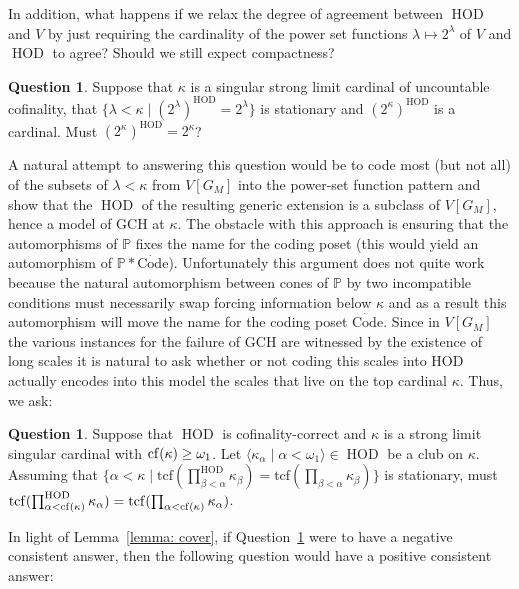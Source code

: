 \documentclass[11pt]{amsart}
\theoremstyle{definition}
\newtheorem{question}[theorem]{Question}
\theoremstyle{remark}
\DeclareMathOperator{\HOD}{HOD}
\newcommand{\cf}{{\rm cf}}
\begin{document}
In addition, what happens if we relax the degree of agreement between $\HOD$ and $V$ by just requiring the cardinality of the power set functions $\lambda \mapsto 2^\lambda$ of $V$ and $\HOD$ to agree? Should we still expect compactness?
\begin{question}\label{que: agreement 2kappa}
    Suppose that $\kappa$ is a  singular strong limit cardinal  of uncountable cofinality, that $\{\lambda < \kappa\mid (2^\lambda)^{\HOD}=2^\lambda\}$ is stationary and $(2^\kappa)^{\HOD}$ is a cardinal. Must $(2^\kappa)^{\HOD}=2^\kappa$?
\end{question}
A natural attempt to answering this question would be to code most (but not all) of the subsets of $\lambda < \kappa$ from $V[G_M]$ into the power-set function pattern and show that the $\HOD$ of the resulting generic extension is a subclass of $V[G_M]$, hence a model of GCH at $\kappa$. The obstacle with this approach is ensuring that the automorphisms of $\mathbb{P}$ fixes the name for the coding poset (this would yield an automorphism of $\mathbb{P}\ast \dot {\mathrm{Code}}$). Unfortunately this argument does not quite work because the natural automorphism between  cones of $\mathbb{P}$ by two  incompatible conditions must necessarily swap forcing information below $\kappa$ and as a result this automorphism will move the name for the coding poset $\dot{\mathrm{Code}}$. Since in $V[G_M]$ the various instances for the failure of GCH are witnessed by the existence of long scales it is natural to ask whether or not coding this scales into HOD actually encodes into this model the scales that live on the top cardinal $\kappa$. Thus, we ask:
\begin{question}
Suppose that $\HOD$ is cofinality-correct and $\kappa$ is a strong limit singular cardinal with $\cf(\kappa)\geq \omega_1$. Let $\langle \kappa_\alpha\mid \alpha < \omega_1\rangle\in \HOD$ be a club on $\kappa$. Assuming that  $\{\alpha <\kappa\mid \mathrm{tcf}(\prod^{\HOD}_{\beta < \alpha}\kappa_\beta)=\mathrm{tcf}(\prod_{\beta < \alpha}\kappa_\beta)\}$ is stationary, must $\mathrm{tcf}(\prod^{\HOD}_{\alpha < \cf(\kappa)}\kappa_\alpha)=\mathrm{tcf}(\prod_{\alpha < \cf(\kappa)}\kappa_\alpha)$.
\end{question}

\smallskip

In light of Lemma~\ref{lemma: cover}, if Question~\ref{que: agreement 2kappa} were to have a negative consistent answer,  then the following question would have a positive consistent answer:
\end{document}
